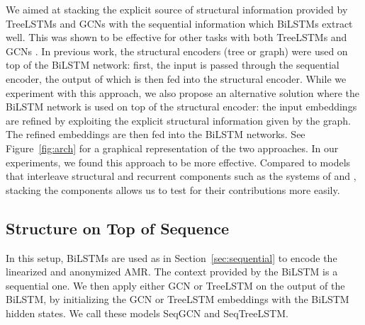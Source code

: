 \documentclass[11pt,a4paper]{article}
\begin{document}
We aimed at stacking the explicit source of structural information provided by TreeLSTMs and GCNs with the sequential information which BiLSTMs extract well. 
This was shown to be effective for other tasks with both TreeLSTMs \cite{eriguchi2016tree,chen2017improved} and GCNs \cite{marcheggiani2017encoding,cetoli2017graph,bastings2017graph}. In previous work, the structural encoders (tree or graph) were used on top of the BiLSTM network: first, the input is passed through the sequential encoder, the output of which is then fed into the structural encoder. While we experiment with this approach, we also propose an alternative solution where the BiLSTM network is used on top of the structural encoder: the input embeddings are refined by exploiting the explicit structural information given by the graph. The refined embeddings are then fed into the BiLSTM networks. See Figure~\ref{fig:arch} for a graphical representation of the two approaches. In our experiments, we found this approach to be more effective. Compared to models that interleave structural and recurrent components such as the systems of  and , stacking the components allows us to test for their contributions more easily.

\subsection{Structure on Top of Sequence}
\label{sec:ontopofbilstm}
In this setup, BiLSTMs are used as in Section~\ref{sec:sequential} to encode the linearized and anonymized AMR.
The context provided by the BiLSTM is a sequential one. We then apply either GCN or TreeLSTM on the output of the BiLSTM, by initializing the GCN or TreeLSTM embeddings with the BiLSTM hidden states. We call these models {\sc SeqGCN} and \nohyphens{{\sc SeqTreeLSTM}}.
\end{document}
